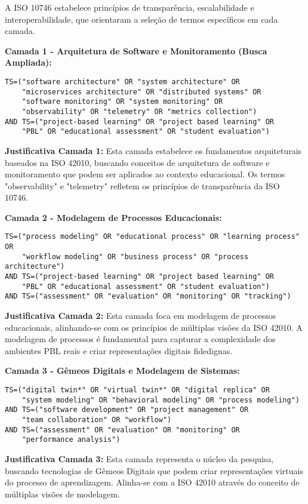 \documentclass[english, spanish, brazilian]{RBIEarticle} %
\begin{document}
A ISO 10746 estabelece princípios de transparência, escalabilidade e interoperabilidade, que orientaram a seleção de termos específicos em cada camada.

\textbf{Camada 1 - Arquitetura de Software e Monitoramento (Busca Ampliada):}
\begin{verbatim}
TS=("software architecture" OR "system architecture" OR
    "microservices architecture" OR "distributed systems" OR
    "software monitoring" OR "system monitoring" OR
    "observability" OR "telemetry" OR "metrics collection")
AND TS=("project-based learning" OR "project based learning" OR
    "PBL" OR "educational assessment" OR "student evaluation")
\end{verbatim}

\textbf{Justificativa Camada 1:} Esta camada estabelece os fundamentos arquiteturais baseados na ISO 42010, buscando conceitos de arquitetura de software e monitoramento que podem ser aplicados ao contexto educacional. Os termos "observability" e "telemetry" refletem os princípios de transparência da ISO 10746.

\textbf{Camada 2 - Modelagem de Processos Educacionais:}
\begin{verbatim}
TS=("process modeling" OR "educational process" OR "learning process" OR
    "workflow modeling" OR "business process" OR "process architecture")
AND TS=("project-based learning" OR "project based learning" OR
    "PBL" OR "educational assessment" OR "student evaluation")
AND TS=("assessment" OR "evaluation" OR "monitoring" OR "tracking")
\end{verbatim}

\textbf{Justificativa Camada 2:} Esta camada foca em modelagem de processos educacionais, alinhando-se com os princípios de múltiplas visões da ISO 42010. A modelagem de processos é fundamental para capturar a complexidade dos ambientes PBL reais e criar representações digitais fidedignas.

\textbf{Camada 3 - Gêmeos Digitais e Modelagem de Sistemas:}
\begin{verbatim}
TS=("digital twin*" OR "virtual twin*" OR "digital replica" OR
    "system modeling" OR "behavioral modeling" OR "process modeling")
AND TS=("software development" OR "project management" OR
    "team collaboration" OR "workflow")
AND TS=("assessment" OR "evaluation" OR "monitoring" OR
    "performance analysis")
\end{verbatim}

\textbf{Justificativa Camada 3:} Esta camada representa o núcleo da pesquisa, buscando tecnologias de Gêmeos Digitais que podem criar representações virtuais do processo de aprendizagem. Alinha-se com a ISO 42010 através do conceito de múltiplas visões de modelagem.
\end{document}
